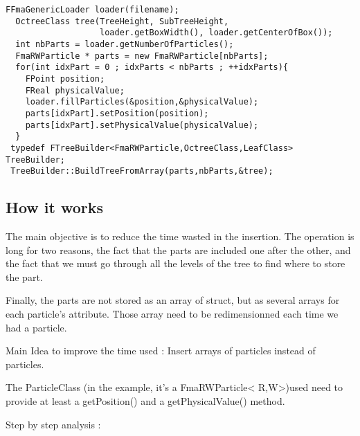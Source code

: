 \documentclass[12pt,letterpaper,titlepage]{article}
\begin{document}
\begin{lstlisting}[frame=single]
  FFmaGenericLoader loader(filename);
  OctreeClass tree(TreeHeight, SubTreeHeight,
                   loader.getBoxWidth(), loader.getCenterOfBox());
  int nbParts = loader.getNumberOfParticles();
  FmaRWParticle * parts = new FmaRWParticle[nbParts];
  for(int idxPart = 0 ; idxParts < nbParts ; ++idxParts){
    FPoint position;
    FReal physicalValue;
    loader.fillParticles(&position,&physicalValue);
    parts[idxPart].setPosition(position);
    parts[idxPart].setPhysicalValue(physicalValue);
  }
 typedef FTreeBuilder<FmaRWParticle,OctreeClass,LeafClass> TreeBuilder;
 TreeBuilder::BuildTreeFromArray(parts,nbParts,&tree);
\end{lstlisting}


\subsection*{How it works}

The main objective is to reduce the time wasted in the insertion. The
operation is long for two reasons, the fact that the parts are
included one after the other, and the fact that we must go through all
the levels of the tree to find where to store the part.

Finally, the parts are not stored as an array of struct, but as
several arrays for each particle's attribute. Those array need to be
redimensionned each time we had a particle.

Main Idea to improve the time used : Insert arrays of particles
instead of particles.

The ParticleClass (in the example, it's a FmaRWParticle\textless
R,W\textgreater)used need to provide at least a getPosition() and a
getPhysicalValue() method.

Step by step analysis :
\end{document}
